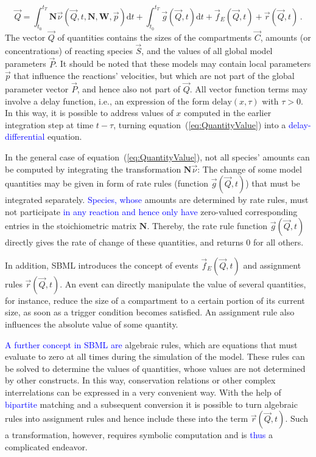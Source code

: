 \documentclass[10pt]{bmc_article}
\newenvironment{bmcformat}{\fussy\setboolean{publ}{true}}{\fussy}
\newcommand{\COR}[1]{\textcolor{blue}{#1}}
\newcommand{\D}{\mathrm{d}}
\begin{document}
\begin{bmcformat}
{\begin{equation}
\vec{Q} = \int_{t_0}^{t_T} \mathbf{N}\vec{\nu}(\vec{Q}, t, \mathbf{N}, \mathbf{W},
\vec{p})\D t + \int_{t_0}^{t_T} \vec{g}(\vec{Q}, t)\D t + \vec{f}_E(\vec{Q}, t) + \vec{r}(\vec{Q}, t)\,.
\label{eq:QuantityValue}
\end{equation}}
The vector $\vec{Q}$ of quantities contains the sizes of the
compartments $\vec{C}$, amounts (or concentrations) of reacting species
$\vec{S}$, and the values of all global model parameters $\vec{P}$.
It should be noted that these models may contain local parameters $\vec{p}$ that
influence the reactions' velocities, but which are not part of the global parameter
vector $\vec{P}$, and hence also not part of $\vec{Q}$.
All vector function terms may involve a delay function, i.e., an expression of 
the form $\mathrm{delay}(x, \tau)$ with $\tau > 0$. In this way, it is possible
to address values of $x$ computed in the earlier integration step at time 
$t - \tau$, turning equation~(\ref{eq:QuantityValue})
into a \COR{delay-differential} equation.

In the general case of equation~(\ref{eq:QuantityValue}), not all species' amounts
can be computed by integrating the transformation $\mathbf{N}\vec{\nu}$: The
change of some model quantities may be given in form of rate rules (function
$\vec{g}(\vec{Q}, t)$) that must be integrated separately.
\COR{Species, whose} amounts are determined by rate rules, must not participate \COR{in any
reaction and hence only have} zero-valued corresponding entries in the
stoichiometric matrix $\mathbf{N}$.
Thereby, the rate rule function $\vec{g}(\vec{Q}, t)$ directly gives the rate of
change of these quantities, and returns 0 for all others.

In addition, \acs{SBML} introduces the concept of events $\vec{f}_E(\vec{Q}, t)$ and
assignment rules $\vec{r}(\vec{Q}, t)$.
An event can directly manipulate the value of several quantities, for instance,
reduce the size of a compartment to a certain portion of its current size,
as soon as a trigger condition becomes satisfied.
An assignment rule also influences the absolute value of some quantity.

\COR{A further concept in \acs{SBML} are} algebraic rules, which are equations that
must evaluate to zero at all times during the simulation of the model.
These rules can be solved to determine the values of quantities, whose values
are not determined by other constructs.
In this way, conservation relations or other complex interrelations can be
expressed in a very convenient way.
With the help of \COR{bipartite} matching \cite{hopcroft1973n} and a subsequent conversion it is possible
to turn algebraic rules into assignment rules and hence include these into the
term $\vec{r}(\vec{Q}, t)$.
Such a transformation, however, requires symbolic computation and is
\COR{thus} a complicated endeavor.


\end{bmcformat}
\end{document}

